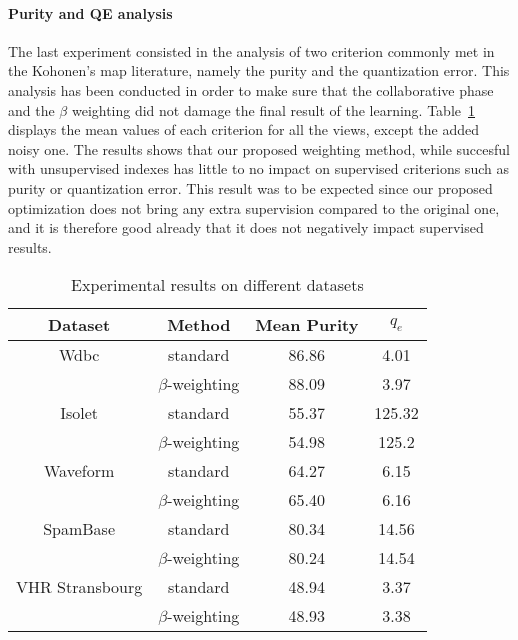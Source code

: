 \paragraph{Purity and QE analysis}
The last experiment consisted in the analysis of two criterion commonly met in the Kohonen's map literature, namely the purity and the quantization error. This analysis has been conducted in order to make sure that the collaborative phase and the $\beta$ weighting did not damage the final result of the learning. Table~\ref{tab:criterion} displays the mean values of each criterion for all the views, except the added noisy one. The results shows that our proposed weighting method, while succesful with unsupervised indexes has little to no impact on supervised criterions such as purity or quantization error. This result was to be expected since our proposed optimization does not bring any extra supervision compared to the original one, and it is therefore good already that it does not negatively impact supervised results.

\begin{table}[!h]
	\caption{Experimental results on different datasets}
\label{tab:criterion}
	\begin{center}
				\begin{tabular}{cccc}
			\toprule
			Dataset 	& Method 			& Mean Purity  & $q_e$
			\\ 			\midrule
						Wdbc		& standard  		& 86.86 & 4.01  \\
						& $\beta$-weighting  	& 88.09 & 3.97  \\ \midrule 
			Isolet 		& standard    		& 55.37 & 125.32 \\
						& $\beta$-weighting    & 54.98 & 125.2 \\ \midrule 
			Waveform    & standard     		& 64.27 & 6.15  \\
						& $\beta$-weighting    & 65.40 & 6.16  \\ \midrule 
			SpamBase    & standard     		& 80.34 & 14.56 \\ 
						& $\beta$-weighting    & 80.24 & 14.54 \\ \midrule
			VHR Stransbourg    & standard     		& 48.94 & 3.37 \\ 
						& $\beta$-weighting    & 48.93 & 3.38 \\ \bottomrule
		\end{tabular}
	\end{center}
\end{table}




